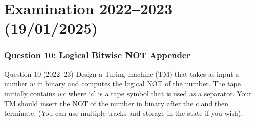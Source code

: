 \documentclass[11pt,a4paper]{article}
\begin{document}
\part{Examination 2022--2023 (19/01/2025)}

\section{Question 10: Logical Bitwise NOT Appender}
\begin{questionbox}{Question 10 (2022--23)}
Design a Turing machine (TM) that takes as input a number $w$ in binary and computes the logical NOT of the number. The tape initially contains $wc$ where `$c$' is a tape symbol that is used as a separator. Your TM should insert the NOT of the number in binary after the $c$ and then terminate. (You can use multiple tracks and storage in the state if you wish).
\end{questionbox}
\end{document}
